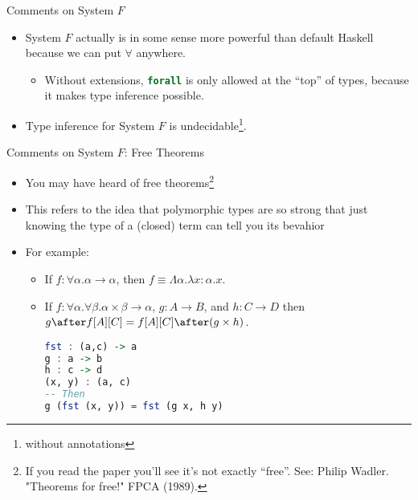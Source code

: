 \documentclass[leqno,presentation,usenames,dvipsnames]{beamer}
\begin{document}
\begin{frame}[fragile]{Comments on System $F$}
    \begin{itemize}
        \item System $F$ actually is in some sense more powerful than default Haskell because we can put $\forall$ anywhere.
            \begin{itemize}
                \item Without extensions, \lstinline[language=haskell, basicstyle=\small\ttfamily]{forall} is only allowed at the ``top'' of types, because it makes type inference possible.
            \end{itemize}
        \item Type inference for System $F$ is undecidable\footnote{without annotations}.
    \end{itemize}
\end{frame}

\begin{frame}[fragile]{Comments on System $F$: Free Theorems}
    \begin{itemize}
        \item You may have heard of free theorems\footnote{If you read the paper you'll see it's not exactly ``free''. See: Philip Wadler. "Theorems for free!" FPCA (1989).}
        \item This refers to the idea that polymorphic types are so strong that just knowing the type of a (closed) term can tell you its bevahior
        \item For example:
            \begin{itemize}
                \item If $f : \forall \alpha. \alpha \to \alpha$, then $f \equiv \Lambda \alpha. \lambda x : \alpha. x$.
                \item If $f : \forall \alpha. \forall \beta. \alpha \times \beta \to \alpha$, $g : A \to B$, and $h : C \to D$ then $g \after f[A][C] = f[A][C] \after (g \times h)$.
\begin{lstlisting}[language=haskell, basicstyle=\small\ttfamily]
fst : (a,c) -> a
g : a -> b
h : c -> d
(x, y) : (a, c)
-- Then
g (fst (x, y)) = fst (g x, h y)
\end{lstlisting}
            \end{itemize}
    \end{itemize}
\end{frame}
\end{document}
